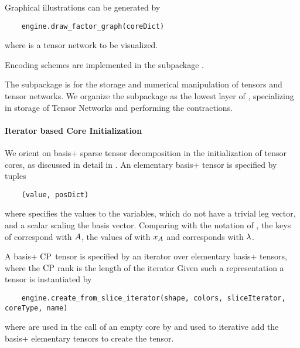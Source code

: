 Graphical illustrations can be generated by
\begin{lstlisting}
	engine.draw_factor_graph(coreDict)
\end{lstlisting}
where  is a tensor network to be visualized.


\subsect{\bnencoding}
Encoding schemes are implemented in the subpackage \sprepresentation.



\label{sec:implementationEngine}

The \spengine subpackage is for the storage and numerical manipulation of tensors and tensor networks.
We organize the subpackage as the lowest layer of \tnreason, specializing in storage of Tensor Networks and performing the contractions.


\paragraph{Iterator based Core Initialization}
We orient on basis+ sparse tensor decomposition in the initialization of tensor cores, as discussed in detail in .
An elementary basis+ tensor is specified by tuples
\begin{lstlisting}
	(value, posDict)
\end{lstlisting}
where  specifies the values to the variables, which do not have a trivial leg vector, and  a scalar scaling the basis vector.
Comparing with the notation of , the keys of  correspond with $A$, the values of  with $x_{A}$ and  corresponds with $\lambda$.

A basis+ $\mathrm{CP}$ tensor is specified by an iterator  over elementary basis+ tensors, where the $\mathrm{CP}$ rank is the length of the iterator
Given such a representation a tensor is instantiated by
\begin{lstlisting}
	engine.create_from_slice_iterator(shape, colors, sliceIterator, coreType, name)
\end{lstlisting}
where  are used in the call of an empty core by  and  used to iterative add the basis+ elementary tensors to create the tensor.

